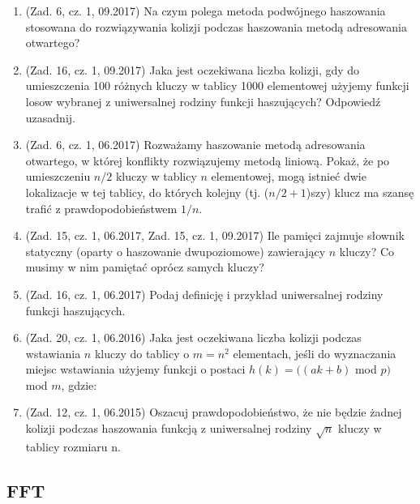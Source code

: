 \documentclass[10pt]{article}%
\begin{document}
\begin{enumerate}

\item (Zad. 6, cz. 1, 09.2017) Na czym polega metoda podwójnego haszowania stosowana do rozwiązywania kolizji podczas haszowania metodą adresowania otwartego?

\item (Zad. 16, cz. 1, 09.2017) Jaka jest oczekiwana liczba kolizji, gdy do umieszczenia 100 różnych kluczy w tablicy 1000 elementowej użyjemy funkcji losow wybranej z uniwersalnej rodziny funkcji haszujących? Odpowiedź uzasadnij.

\item (Zad. 6, cz. 1, 06.2017) Rozważamy haszowanie metodą adresowania otwartego, w której konflikty rozwiązujemy metodą liniową. Pokaż, że po umieszczeniu $n/2$ kluczy w tablicy $n$ elementowej, mogą istnieć dwie lokalizacje w tej tablicy, do których kolejny (tj. ($n/2 + 1$)szy) klucz ma szansę trafić z prawdopodobieństwem $1/n$.

\item (Zad. 15, cz. 1, 06.2017, Zad. 15, cz. 1, 09.2017) Ile pamięci zajmuje słownik statyczny (oparty o haszowanie dwupoziomowe) zawierający $n$ kluczy? Co musimy w nim pamiętać oprócz samych kluczy?

\item (Zad. 16, cz. 1, 06.2017) Podaj definicję i przykład uniwersalnej rodziny funkcji haszujących.

\item (Zad. 20, cz. 1, 06.2016) Jaka jest oczekiwana liczba kolizji podczas wstawiania $n$ kluczy do tablicy o $ m = n^2 $ elementach, jeśli do wyznaczania miejsc wstawiania użyjemy funkcji o postaci $h(k) = ((ak + b)$ mod $p)$ mod $m$, gdzie:

\item (Zad. 12, cz. 1, 06.2015) Oszacuj prawdopodobieństwo, że nie będzie żadnej kolizji podczas haszowania funkcją z uniwersalnej rodziny $\sqrt{n}$ kluczy w tablicy rozmiaru n. 

\end{enumerate}


\subsection{FFT}
\end{document}
